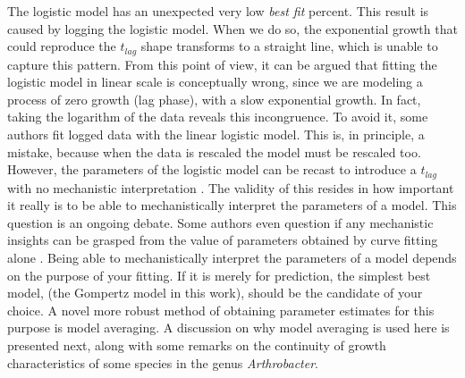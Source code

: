 \documentclass[titlepage,11pt]{article}
\begin{document}
\begin{linenumbers}
		The logistic model has an unexpected very low \textit{best fit} percent. This result is caused by logging the logistic model. When we do so, the exponential growth that could reproduce the $ t_{lag} $ shape transforms to a straight line, which is unable to capture this pattern. From this point of view, it can be argued that fitting the logistic model in linear scale is conceptually wrong, since we are modeling a process of zero growth (lag phase), with a slow exponential growth. In fact, taking the logarithm of the data reveals this incongruence. To avoid it, some authors \cite{Micha2011, Zwietering1990} fit logged data with the linear logistic model. This  is, in principle, a mistake, because when the data is rescaled the model must be rescaled too. However, the parameters of the logistic model can be recast to introduce a $ t_{lag} $ with no mechanistic interpretation \cite{Zwietering1990}. The validity of this resides in how important it really is to be able to mechanistically interpret the parameters of a model. This question is an ongoing debate. Some authors even question if any mechanistic insights can be  grasped from the value of parameters obtained by curve fitting alone \cite{Micha2011}. Being able to mechanistically interpret the parameters of a model depends on the purpose of your fitting. If it is merely for prediction, the simplest best  model, (the Gompertz model in this work), should be the candidate of your choice. A  novel more robust method of obtaining parameter estimates for this purpose is model averaging. A discussion on why model averaging is used here is presented next, along with some remarks on the continuity of growth characteristics of some species in the genus \textit{Arthrobacter}.\\
		

\end{linenumbers}
\end{document}
